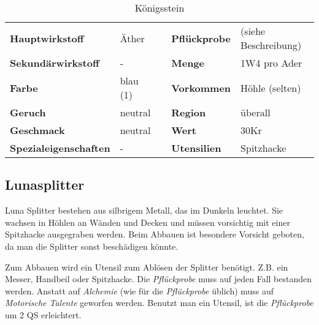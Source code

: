 \begin{table}[H] 
\begin{center} 
\begin{tabular}{|l|l|p{1cm}|l|l|} 
  	\cline{1-2} \cline{4-5} 
  	\textbf{Hauptwirkstoff} & Äther && \textbf{Pflückprobe} & (siehe Beschreibung) \\ \cline{1-2} \cline{4-5} 
  	\textbf{Sekundärwirkstoff} & - && \textbf{Menge} & 1W4 pro Ader \\ \cline{1-2} \cline{4-5} 
  	\textbf{Farbe} & blau (1) && \textbf{Vorkommen} & Höhle (selten) \\ \cline{1-2} \cline{4-5} 
  	\textbf{Geruch} & neutral && \textbf{Region} & überall \\ \cline{1-2} \cline{4-5} 
  	\textbf{Geschmack} & neutral && \textbf{Wert} & 30Kr \\ \cline{1-2} \cline{4-5} 
  	\textbf{Spezialeigenschaften} & - && \textbf{Utensilien} & Spitzhacke \\ \cline{1-2} \cline{4-5} 
\end{tabular} 
\end{center} 
\caption{Königsstein} 
\label{tab:koenigsstein} 
\end{table}


\subsection{Lunasplitter}
Luna Splitter bestehen aus silbrigem Metall, das im Dunkeln leuchtet. Sie wachsen in Höhlen an Wänden und Decken und müssen vorsichtig mit einer Spitzhacke ausgegraben werden. Beim Abbauen ist besondere Vorsicht geboten, da man die Splitter sonst beschädigen könnte. 

Zum Abbauen wird ein Utensil zum Ablösen der Splitter benötigt. Z.B. ein Messer, Handbeil oder Spitzhacke. Die \textit{Pflückprobe} muss auf jeden Fall bestanden werden. Anstatt auf \textit{Alchemie} (wie für die \textit{Pflückprobe} üblich) muss auf \textit{Motorische Talente} geworfen werden. Benutzt man ein Utensil, ist die \textit{Pflückprobe} um 2 QS erleichtert.

